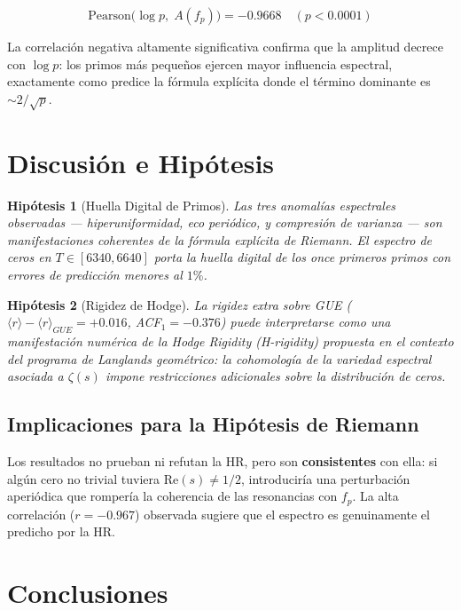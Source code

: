 \documentclass[12pt, a4paper]{article}
\newtheorem{hipotesis}{Hipótesis}
\begin{document}
\[
  \text{Pearson}\bigl(\log p,\; A(f_p)\bigr) = -0.9668 \quad (p < 0.0001)
\]

La correlación negativa altamente significativa confirma que la amplitud
decrece con $\log p$: los primos más pequeños ejercen mayor influencia
espectral, exactamente como predice la fórmula explícita donde el término
dominante es $\sim 2/\sqrt{p}$.

\section{Discusión e Hipótesis}

\begin{hipotesis}[Huella Digital de Primos]
Las tres anomalías espectrales observadas — hiperuniformidad, eco
periódico, y compresión de varianza — son manifestaciones coherentes de
la fórmula explícita de Riemann. El espectro de ceros en
$T \in [6340, 6640]$ porta la \emph{huella digital} de los once primeros
primos con errores de predicción menores al $1\%$.
\end{hipotesis}

\begin{hipotesis}[Rigidez de Hodge]
La rigidez extra sobre GUE ($\langle r\rangle - \langle r\rangle_{GUE}
= +0.016$, ACF$_1 = -0.376$) puede interpretarse como una manifestación
numérica de la \emph{Hodge Rigidity} (H-rigidity) propuesta en el
contexto del programa de Langlands geométrico: la cohomología de la
variedad espectral asociada a $\zeta(s)$ impone restricciones adicionales
sobre la distribución de ceros.
\end{hipotesis}

\subsection{Implicaciones para la Hipótesis de Riemann}

Los resultados no prueban ni refutan la HR, pero son \textbf{consistentes}
con ella: si algún cero no trivial tuviera $\text{Re}(s) \neq 1/2$,
introduciría una perturbación aperiódica que rompería la coherencia de
las resonancias con $f_p$. La alta correlación ($r = -0.967$) observada
sugiere que el espectro es genuinamente el predicho por la HR.

\section{Conclusiones}
\end{document}
